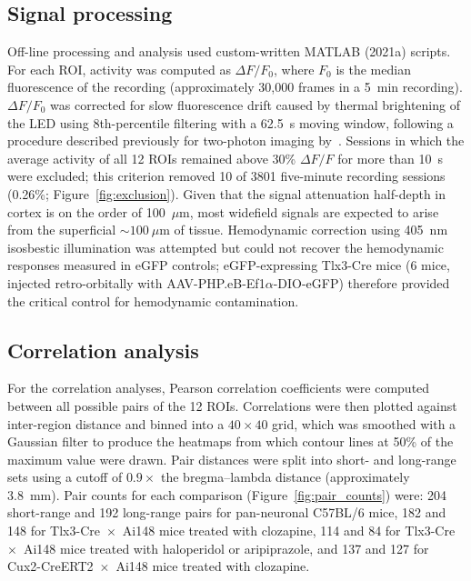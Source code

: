 \documentclass[11pt]{article}
\begin{document}
\subsection{Signal processing}
Off-line processing and analysis used custom-written MATLAB (2021a) scripts. For each ROI, activity was computed as $\Delta F / F_0$, where $F_0$ is the median fluorescence of the recording (approximately 30{,}000 frames in a 5~min recording). $\Delta F / F_0$ was corrected for slow fluorescence drift caused by thermal brightening of the LED using 8th-percentile filtering with a 62.5~s moving window, following a procedure described previously for two-photon imaging by~\citet{dombeck2007imaging}. Sessions in which the average activity of all 12 ROIs remained above 30\% $\Delta F / F$ for more than 10~s were excluded; this criterion removed 10 of 3801 five-minute recording sessions (0.26\%; Figure~\ref{fig:exclusion}). Given that the signal attenuation half-depth in cortex is on the order of 100~$\mu$m, most widefield signals are expected to arise from the superficial ${\sim}100~\mu$m of tissue. Hemodynamic correction using 405~nm isosbestic illumination was attempted but could not recover the hemodynamic responses measured in eGFP controls; eGFP-expressing Tlx3-Cre mice (6 mice, injected retro-orbitally with AAV-PHP.eB-Ef1$\alpha$-DIO-eGFP) therefore provided the critical control for hemodynamic contamination.

\subsection{Correlation analysis}
For the correlation analyses, Pearson correlation coefficients were computed between all possible pairs of the 12 ROIs. Correlations were then plotted against inter-region distance and binned into a $40\times40$ grid, which was smoothed with a Gaussian filter to produce the heatmaps from which contour lines at 50\% of the maximum value were drawn. Pair distances were split into short- and long-range sets using a cutoff of $0.9\times$ the bregma--lambda distance (approximately 3.8~mm). Pair counts for each comparison (Figure~\ref{fig:pair_counts}) were: 204 short-range and 192 long-range pairs for pan-neuronal C57BL/6 mice, 182 and 148 for Tlx3-Cre~$\times$~Ai148 mice treated with clozapine, 114 and 84 for Tlx3-Cre~$\times$~Ai148 mice treated with haloperidol or aripiprazole, and 137 and 127 for Cux2-CreERT2~$\times$~Ai148 mice treated with clozapine.
\end{document}
